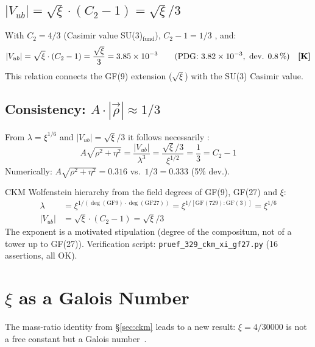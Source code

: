 \subsection{$|V_{ub}| = \sqrt{\xi}\cdot(C_2-1) = \sqrt{\xi}/3$}

With $C_2 = 4/3$ (Casimir value SU(3)$_\text{fund}$), $C_2-1 = 1/3$ \BM, and:
\begin{equation}
  |V_{ub}| = \sqrt{\xi}\cdot(C_2-1) = \frac{\sqrt{\xi}}{3}
  = 3.85\times10^{-3}
  \qquad (\text{PDG: } 3.82\times10^{-3}, \text{ dev. } 0.8\,\%) \quad \textbf{[K]}
\end{equation}
This relation connects the GF(9) extension ($\sqrt{\xi}$) with the
SU(3) Casimir value.

\subsection{Consistency: $A\cdot|\vec{\rho}| \approx 1/3$}

From $\lambda=\xi^{1/6}$ and $|V_{ub}|=\sqrt{\xi}/3$ it follows necessarily \KM:
\begin{equation}
  A\sqrt{\rho^2+\eta^2} = \frac{|V_{ub}|}{\lambda^3} = \frac{\sqrt{\xi}/3}{\xi^{1/2}}
  = \frac{1}{3} = C_2-1
\end{equation}
Numerically: $A\sqrt{\rho^2+\eta^2} = 0.316$ vs.\ $1/3 = 0.333$ (5\% dev.).

\begin{keyresult}[Status~\KM]
CKM Wolfenstein hierarchy from the field degrees of GF(9), GF(27) and $\xi$:
\begin{align*}
  \lambda &= \xi^{1/(\deg(\mathrm{GF}9)\cdot\deg(\mathrm{GF}27))}
  = \xi^{1/[\mathrm{GF}(729):\mathrm{GF}(3)]} = \xi^{1/6}\\
  |V_{ub}| &= \sqrt{\xi}\cdot(C_2-1) = \sqrt{\xi}/3
\end{align*}
The exponent is a motivated stipulation (degree of the compositum, not of a tower up to GF(27)).
Verification script: \texttt{pruef\_329\_ckm\_xi\_gf27.py} (16 assertions, all OK).
\end{keyresult}

\section{$\xi$ as a Galois Number}
\label{sec:xi_galois}

The mass-ratio identity from §\ref{sec:ckm} leads to a new result:
$\xi = 4/30000$ is not a free constant but a Galois number~\KM.

